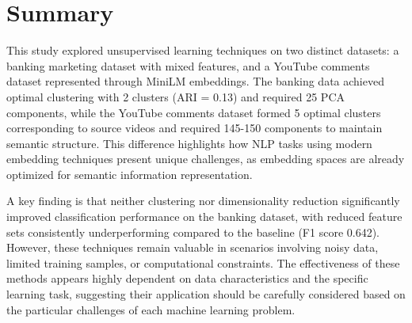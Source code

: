 \documentclass[conference]{IEEEtran}
\begin{document}
\section{Summary}
This study explored unsupervised learning techniques on two distinct datasets: a banking marketing dataset with mixed features, and a YouTube comments dataset represented through MiniLM embeddings. The banking data achieved optimal clustering with 2 clusters (ARI = 0.13) and required 25 PCA components, while the YouTube comments dataset formed 5 optimal clusters corresponding to source videos and required 145-150 components to maintain semantic structure. This difference highlights how NLP tasks using modern embedding techniques present unique challenges, as embedding spaces are already optimized for semantic information representation.

A key finding is that neither clustering nor dimensionality reduction significantly improved classification performance on the banking dataset, with reduced feature sets consistently underperforming compared to the baseline (F1 score 0.642). However, these techniques remain valuable in scenarios involving noisy data, limited training samples, or computational constraints. The effectiveness of these methods appears highly dependent on data characteristics and the specific learning task, suggesting their application should be carefully considered based on the particular challenges of each machine learning problem.
\end{document}
